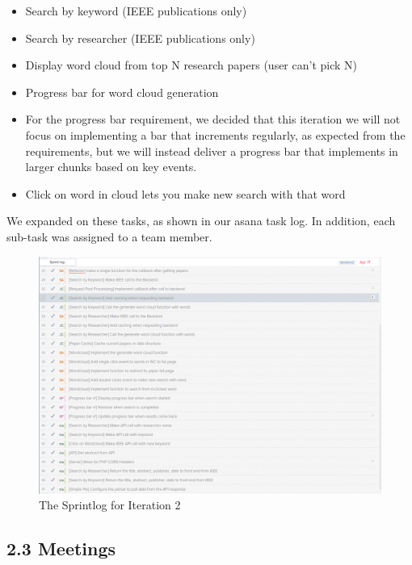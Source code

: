 \documentclass[]{article}
\begin{document}
\begin{itemize}
  \begin{itemize}
  \itemsep1pt\parskip0pt
  \item
    Search by keyword (IEEE publications only)
  \item
    Search by researcher (IEEE publications only)
  \item
    Display word cloud from top N research papers (user can't pick N)
  \item
    Progress bar for word cloud generation
  \item
    For the progress bar requirement, we decided that this iteration we
    will not focus on implementing a bar that increments regularly, as
    expected from the requirements, but we will instead deliver a
    progress bar that implements in larger chunks based on key events.
  \item
    Click on word in cloud lets you make new search with that word
  \end{itemize}
\end{itemize}

We expanded on these tasks, as shown in our asana task log. In addition, each sub-task was assigned to a team member.

\begin{figure}[htbp]
\centering
\includegraphics{images/sprintlog.png}
\caption{The Sprintlog for Iteration 2}
\end{figure}


\subsection{2.3 Meetings}\label{meetings}
\end{document}
